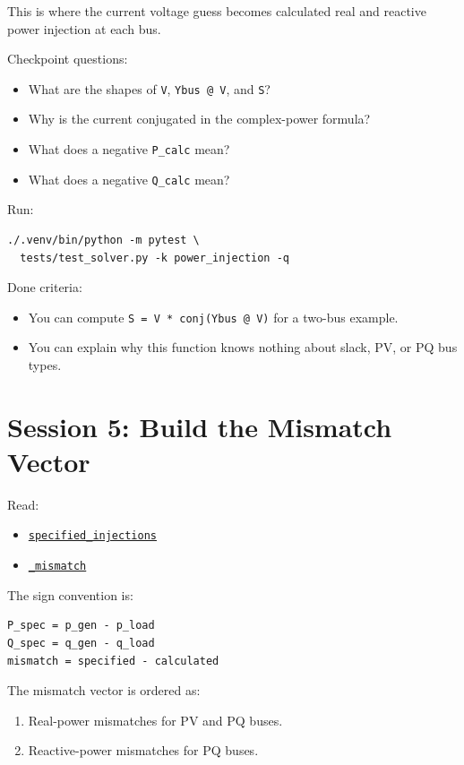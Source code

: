 \documentclass[11pt]{article}
\newcommand{\code}[1]{\texttt{#1}}
\begin{document}
This is where the current voltage guess becomes calculated real and reactive
power injection at each bus.

Checkpoint questions:

\begin{itemize}
  \item What are the shapes of \code{V}, \code{Ybus @ V}, and \code{S}?
  \item Why is the current conjugated in the complex-power formula?
  \item What does a negative \code{P\_calc} mean?
  \item What does a negative \code{Q\_calc} mean?
\end{itemize}

Run:

\begin{verbatim}
./.venv/bin/python -m pytest \
  tests/test_solver.py -k power_injection -q
\end{verbatim}

Done criteria:

\begin{itemize}
  \item You can compute \code{S = V * conj(Ybus @ V)} for a two-bus example.
  \item You can explain why this function knows nothing about slack, PV, or PQ
  bus types.
\end{itemize}

\section{Session 5: Build the Mismatch Vector}

Read:

\begin{itemize}
  \item \href{../src/powerflow/solver.py\#L30}{\code{specified\_injections}}
  \item \href{../src/powerflow/solver.py\#L62}{\code{\_mismatch}}
\end{itemize}

The sign convention is:

\begin{verbatim}
P_spec = p_gen - p_load
Q_spec = q_gen - q_load
mismatch = specified - calculated
\end{verbatim}

The mismatch vector is ordered as:

\begin{enumerate}
  \item Real-power mismatches for PV and PQ buses.
  \item Reactive-power mismatches for PQ buses.
\end{enumerate}
\end{document}
